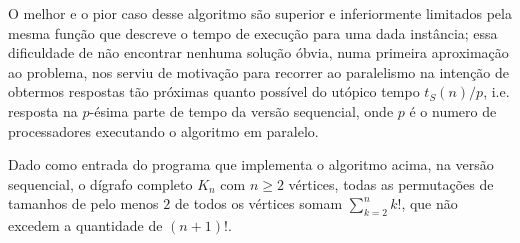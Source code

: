 \documentclass[a4paper,article,10pt]{article}
\begin{document}
    O melhor e o pior caso desse algoritmo são superior e inferiormente
    limitados pela mesma função que descreve o tempo de execução para uma dada
    instância; essa dificuldade de não encontrar nenhuma solução óbvia, numa
    primeira aproximação ao problema, nos serviu de motivação para recorrer ao
    paralelismo na intenção de obtermos respostas tão próximas quanto possível
    do utópico tempo $t_S (n)/p$, i.e. resposta na $p$-ésima parte de
    tempo da versão sequencial, onde $p$ é o numero de processadores executando
    o algoritmo em paralelo.

    Dado como entrada do programa que implementa o algoritmo acima, na versão
    sequencial, o dígrafo completo $K_n$ com $n\geq 2$ vértices, todas as
    permutações de tamanhos de pelo menos $2$ de todos os vértices somam
    $\sum_{k=2}^n k!$, que não excedem a quantidade de $(n+1)!$.
\end{document}
